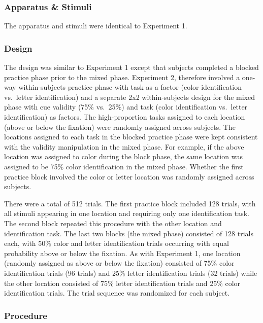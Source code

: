 \documentclass[english,,man,floatsintext]{apa6}
\begin{document}
\subsubsection{Apparatus \& Stimuli}\label{apparatus-stimuli-1}

The apparatus and stimuli were identical to Experiment 1.

\subsubsection{Design}\label{design-1}

The design was similar to Experiment 1 except that subjects completed a
blocked practice phase prior to the mixed phase. Experiment 2, therefore
involved a one-way within-subjects practice phase with task as a factor
(color identification vs.~letter identification) and a separate 2x2
within-subjects design for the mixed phase with cue validity (75\%
vs.~25\%) and task (color identification vs.~letter identification) as
factors. The high-proportion tasks assigned to each location (above or
below the fixation) were randomly assigned across subjects. The
locations assigned to each task in the blocked practice phase were kept
consistent with the validity manipulation in the mixed phase. For
example, if the above location was assigned to color during the block
phase, the same location was assigned to be 75\% color identification in
the mixed phase. Whether the first practice block involved the color or
letter location was randomly assigned across subjects.

There were a total of 512 trials. The first practice block included 128
trials, with all stimuli appearing in one location and requiring only
one identification task. The second block repeated this procedure with
the other location and identification task. The last two blocks (the
mixed phase) consisted of 128 trials each, with 50\% color and letter
identification trials occurring with equal probability above or below
the fixation. As with Experiment 1, one location (randomly assigned as
above or below the fixation) consisted of 75\% color identification
trials (96 trials) and 25\% letter identification trials (32 trials)
while the other location consisted of 75\% letter identification trials
and 25\% color identification trials. The trial sequence was randomized
for each subject.

\subsubsection{Procedure}\label{procedure-1}
\end{document}
